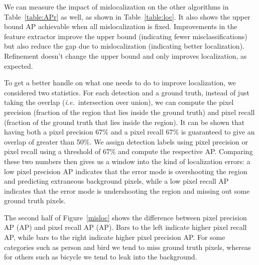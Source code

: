 \documentclass[runningheads]{llncs}
\newcommand\ie{\emph{i.e.}\ }
\begin{document}
We can measure the impact of mislocalization on the other algorithms in Table~\ref{table:APr} as well, as shown in Table~\ref{table:loc}. It also shows the upper bound AP achievable when all mislocalization is fixed. Improvements in the feature extractor improve the upper bound (indicating fewer misclassifications) but also reduce the gap due to mislocalization (indicating better localization). Refinement doesn't change the upper bound and only improves localization, as expected. 


To get a better handle on what one needs to do to improve localization, we considered two statistics. For each detection and a ground truth, instead of just taking the overlap (\ie intersection over union), we can compute the pixel precision (fraction of the region that lies inside the ground truth) and pixel recall (fraction of the ground truth that lies inside the region). It can be shown that having both a pixel precision  67\% and a pixel recall  67\% is guaranteed to give an overlap of greater than 50\%. We assign detection labels using pixel precision or pixel recall using a threshold of 67\% and compute the respective AP. Comparing these two numbers then gives us a window into the kind of localization errors: a low pixel precision AP indicates that the error mode is overshooting the region and predicting extraneous background pixels, while a low pixel recall AP indicates that the error mode is undershooting the region and missing out some ground truth pixels. 

The second half of Figure~\ref{misloc} shows the difference between pixel precision AP (AP) and pixel recall AP (AP). Bars to the left indicate higher pixel recall AP, while bars to the right indicate higher pixel precision AP. For some categories such as person and bird we tend to miss ground truth pixels, whereas for others such as bicycle we tend to leak into the background.
\end{document}
